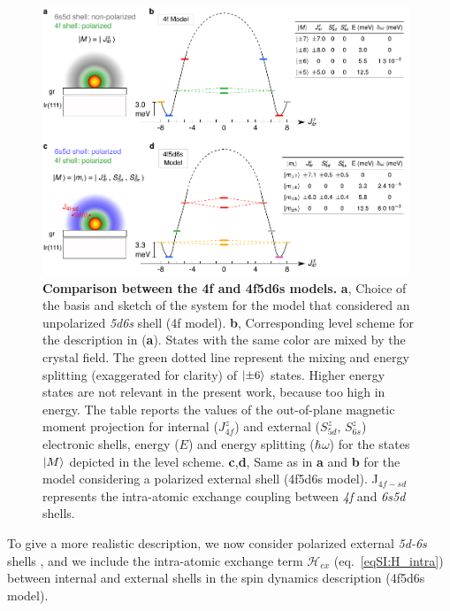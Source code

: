 \documentclass[
reprint,amsmath,amssymb,aps]{revtex4-2}
\begin{document}
\begin{figure}[ht!]
\includegraphics[width=0.98\textwidth]{Fig1_new.pdf}
\caption{\textbf{Comparison between the 4f and 4f5d6s models.} \textbf{a}, Choice of the basis and sketch of the system for the model that considered an unpolarized \textit{5d6s} shell (4f model). \textbf{b}, Corresponding level scheme for the description in (\textbf{a}). States with the same color are mixed by the crystal field. The green dotted line represent the mixing and energy splitting (exaggerated for clarity) of $\ket{\pm6}$ states. Higher energy states are not relevant in the present work, because too high in energy.  The table reports the values of the out-of-plane magnetic moment projection for internal ($J_{4f}^z$) and external ($S^z_{5d}$, $S^z_{6s}$)  electronic shells, energy ($E$) and energy splitting ($\hbar\omega$) for the states $\ket{M}$ depicted in the level scheme. \textbf{c},\textbf{d}, Same as in \textbf{a} and \textbf{b} for the model considering a polarized external shell (4f5d6s model). J$_{4f-sd}$ represents the intra-atomic exchange coupling between \textit{4f} and \textit{6s5d} shells.
\label{fig:intra} }
\end{figure}

To give a more realistic description, we now consider polarized external \textit{5d-6s} shells \cite{pivettaMeasuringIntraAtomicExchange2020}, and we include the intra-atomic exchange term $\mathcal{H}_{ex}$ (eq.~\ref{eqSI:H_intra}) between internal and external shells in the spin dynamics description (4f5d6s model). 
\end{document}

